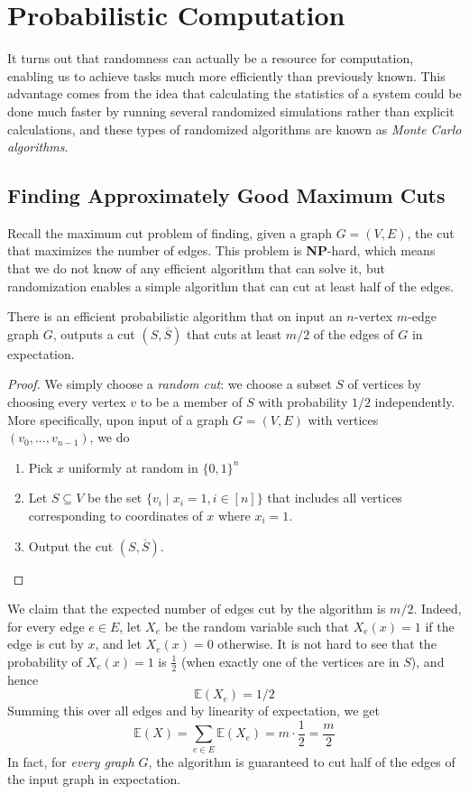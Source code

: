 \section{Probabilistic Computation}

  It turns out that randomness can actually be a resource for computation, enabling us to achieve tasks much more efficiently than previously known. This advantage comes from the idea that calculating the statistics of a system could be done much faster by running several randomized simulations rather than explicit calculations, and these types of randomized algorithms are known as \textit{Monte Carlo algorithms}. 

\subsection{Finding Approximately Good Maximum Cuts}

  Recall the maximum cut problem of finding, given a graph $G = (V, E)$, the cut that maximizes the number of edges. This problem is \textbf{NP}-hard, which means that we do not know of any efficient algorithm that can solve it, but randomization enables a simple algorithm that can cut at least half of the edges. 

  \begin{theorem}
  There is an efficient probabilistic algorithm that on input an $n$-vertex $m$-edge graph $G$, outputs a cut $(S, \overline{S})$ that cuts at least $m/2$ of the edges of $G$ in expectation. 
  \end{theorem}
  \begin{proof}
  We simply choose a \textit{random cut}: we choose a subset $S$ of vertices by choosing every vertex $v$ to be a member of $S$ with probability $1/2$ independently. More specifically, upon input of a graph $G = (V, E)$ with vertices $(v_0, ..., v_{n-1})$, we do
  \begin{enumerate}
      \item Pick $x$ uniformly at random in $\{0,1\}^n$
      \item Let $S \subseteq V$ be the set $\{v_i \;|\; x_i = 1, i \in [n]\}$ that includes all vertices corresponding to coordinates of $x$ where $x_i = 1$. 
      \item Output the cut $(S, \overline{S})$. 
  \end{enumerate}
  \end{proof}

  We claim that the expected number of edges cut by the algorithm is $m/2$. Indeed, for every edge $e \in E$, let $X_e$ be the random variable such that $X_e (x) = 1$ if the edge is cut by $x$, and let $X_e (x) = 0$ otherwise. It is not hard to see that the probability of $X_e (x) = 1$ is $\frac{1}{2}$ (when exactly one of the vertices are in $S$), and hence 
  \[\mathbb{E} (X_e) = 1/2\]
  Summing this over all edges and by linearity of expectation, we get
  \[\mathbb{E}(X) = \sum_{e \in E} \mathbb{E}(X_e) = m \cdot \frac{1}{2} = \frac{m}{2}\]
  In fact, for \textit{every graph $G$}, the algorithm is guaranteed to cut half of the edges of the input graph in expectation. 

